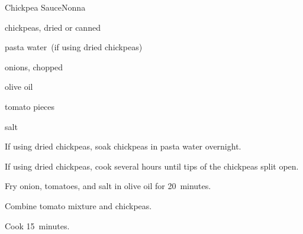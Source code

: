 \begin{recipe}{Chickpea Sauce}{Nonna}{}

\begin{ingredients}
\item chickpeas, dried or canned
\item pasta water~(if using dried chickpeas)
\item onions, chopped
\item olive oil
\item tomato pieces
\item salt
\end{ingredients}

\begin{directions}
\item If using dried chickpeas, soak chickpeas in pasta water overnight.
\item If using dried chickpeas, cook several hours until tips of the chickpeas split open.
\item Fry onion, tomatoes, and salt in olive oil for 20~minutes.
\item Combine tomato mixture and chickpeas.
\item Cook 15~minutes.
\end{directions}

\end{recipe}
